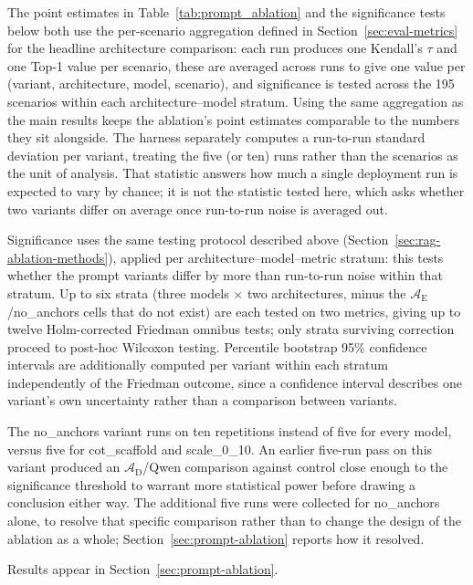 \documentclass[final,3p,times]{elsarticle}
\begin{document}
The point estimates in Table~\ref{tab:prompt_ablation} and the significance tests below both use the per-scenario aggregation defined in Section~\ref{sec:eval-metrics} for the headline architecture comparison: each run produces one Kendall's $\tau$ and one Top-1 value per scenario, these are averaged across runs to give one value per (variant, architecture, model, scenario), and significance is tested across the 195 scenarios within each architecture--model stratum. Using the same aggregation as the main results keeps the ablation's point estimates comparable to the numbers they sit alongside. The harness separately computes a run-to-run standard deviation per variant, treating the five (or ten) runs rather than the scenarios as the unit of analysis. That statistic answers how much a single deployment run is expected to vary by chance; it is not the statistic tested here, which asks whether two variants differ on average once run-to-run noise is averaged out.

Significance uses the same testing protocol described above (Section~\ref{sec:rag-ablation-methods}), applied per architecture--model--metric stratum: this tests whether the prompt variants differ by more than run-to-run noise within that stratum. Up to six strata (three models $\times$ two architectures, minus the $\mathcal{A}_{\text{E}}$/no\_anchors cells that do not exist) are each tested on two metrics, giving up to twelve Holm-corrected Friedman omnibus tests; only strata surviving correction proceed to post-hoc Wilcoxon testing. Percentile bootstrap 95\% confidence intervals are additionally computed per variant within each stratum independently of the Friedman outcome, since a confidence interval describes one variant's own uncertainty rather than a comparison between variants.

The no\_anchors variant runs on ten repetitions instead of five for every model, versus five for cot\_scaffold and scale\_0\_10. An earlier five-run pass on this variant produced an $\mathcal{A}_{\text{D}}$/Qwen comparison against control close enough to the significance threshold to warrant more statistical power before drawing a conclusion either way. The additional five runs were collected for no\_anchors alone, to resolve that specific comparison rather than to change the design of the ablation as a whole; Section~\ref{sec:prompt-ablation} reports how it resolved.

Results appear in Section~\ref{sec:prompt-ablation}.
\end{document}
